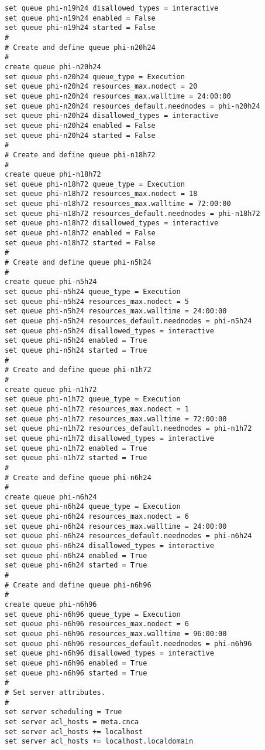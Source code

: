 \begin{lstlisting}
set queue phi-n19h24 disallowed_types = interactive
set queue phi-n19h24 enabled = False
set queue phi-n19h24 started = False
#
# Create and define queue phi-n20h24 
#
create queue phi-n20h24 
set queue phi-n20h24 queue_type = Execution
set queue phi-n20h24 resources_max.nodect = 20
set queue phi-n20h24 resources_max.walltime = 24:00:00
set queue phi-n20h24 resources_default.neednodes = phi-n20h24
set queue phi-n20h24 disallowed_types = interactive
set queue phi-n20h24 enabled = False
set queue phi-n20h24 started = False
#
# Create and define queue phi-n18h72 
#
create queue phi-n18h72 
set queue phi-n18h72 queue_type = Execution
set queue phi-n18h72 resources_max.nodect = 18
set queue phi-n18h72 resources_max.walltime = 72:00:00
set queue phi-n18h72 resources_default.neednodes = phi-n18h72
set queue phi-n18h72 disallowed_types = interactive
set queue phi-n18h72 enabled = False
set queue phi-n18h72 started = False
#
# Create and define queue phi-n5h24
#
create queue phi-n5h24
set queue phi-n5h24 queue_type = Execution
set queue phi-n5h24 resources_max.nodect = 5
set queue phi-n5h24 resources_max.walltime = 24:00:00
set queue phi-n5h24 resources_default.neednodes = phi-n5h24
set queue phi-n5h24 disallowed_types = interactive
set queue phi-n5h24 enabled = True
set queue phi-n5h24 started = True
#
# Create and define queue phi-n1h72
#
create queue phi-n1h72
set queue phi-n1h72 queue_type = Execution
set queue phi-n1h72 resources_max.nodect = 1
set queue phi-n1h72 resources_max.walltime = 72:00:00
set queue phi-n1h72 resources_default.neednodes = phi-n1h72
set queue phi-n1h72 disallowed_types = interactive
set queue phi-n1h72 enabled = True
set queue phi-n1h72 started = True
#
# Create and define queue phi-n6h24
#
create queue phi-n6h24
set queue phi-n6h24 queue_type = Execution
set queue phi-n6h24 resources_max.nodect = 6
set queue phi-n6h24 resources_max.walltime = 24:00:00
set queue phi-n6h24 resources_default.neednodes = phi-n6h24
set queue phi-n6h24 disallowed_types = interactive
set queue phi-n6h24 enabled = True
set queue phi-n6h24 started = True
#
# Create and define queue phi-n6h96
#
create queue phi-n6h96
set queue phi-n6h96 queue_type = Execution
set queue phi-n6h96 resources_max.nodect = 6
set queue phi-n6h96 resources_max.walltime = 96:00:00
set queue phi-n6h96 resources_default.neednodes = phi-n6h96
set queue phi-n6h96 disallowed_types = interactive
set queue phi-n6h96 enabled = True
set queue phi-n6h96 started = True
#
# Set server attributes.
#
set server scheduling = True
set server acl_hosts = meta.cnca
set server acl_hosts += localhost
set server acl_hosts += localhost.localdomain

\end{lstlisting}
